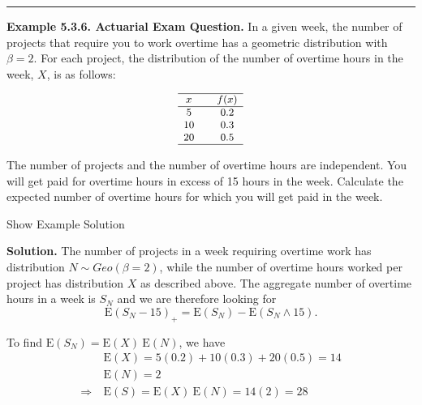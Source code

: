 \documentclass[]{book}
\theoremstyle{definition}
\theoremstyle{definition}
\theoremstyle{definition}
\theoremstyle{remark}
\begin{document}
\begin{center}\rule{0.5\linewidth}{\linethickness}\end{center}

\textbf{Example 5.3.6. Actuarial Exam Question.} In a given week, the
number of projects that require you to work overtime has a geometric
distribution with \(\beta=2\). For each project, the distribution of the
number of overtime hours in the week, \(X\), is as follows:

\[
{\small 
\begin{matrix}
\begin{array}{ccc} \hline
    x &  & f(x)\\ \hline
    5 &  & 0.2 \\
    10 & & 0.3 \\
    20 & & 0.5\\ \hline
  \end{array}
\end{matrix}
}
\]

The number of projects and the number of overtime hours are independent.
You will get paid for overtime hours in excess of 15 hours in the week.
Calculate the expected number of overtime hours for which you will get
paid in the week.

Show Example Solution

\hypertarget{toggleExampleAggLoss.3.6}{}
\textbf{Solution.} The number of projects in a week requiring overtime
work has distribution \(N \sim Geo(\beta=2)\), while the number of
overtime hours worked per project has distribution \(X\) as described
above. The aggregate number of overtime hours in a week is \(S_N\) and
we are therefore looking for
\[\mathrm{E}(S_N-15)_+ = \mathrm{E}(S_N) - \mathrm{E}(S_N \wedge 15).\]

To find \(\mathrm{E}(S_N) = \mathrm{E}(X) ~\mathrm{E}(N)\), we have
\[\begin{aligned}
&\mathrm{E}(X) = 5(0.2) + 10(0.3)+ 20(0.5)= 14 \\
&\mathrm{E}(N) = 2 \\
\Rightarrow \ &\mathrm{E}(S) = \mathrm{E}(X) ~ \mathrm{E}(N) = 14(2) = 28
\end{aligned}\]
\end{document}

